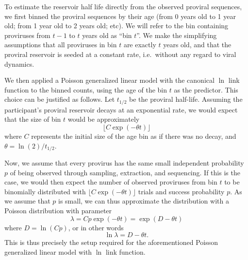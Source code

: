 \documentclass{article}
\begin{document}
To estimate the reservoir half life directly from the observed proviral
sequences, we first binned the proviral sequences by their age (from 0 years
old to 1 year old; from 1 year old to 2 years old; etc).  We will refer to the
bin containing proviruses from $t-1$ to $t$ years old as ``bin $t$''.  We make
the simplifying assumptions that all proviruses in bin $t$ are exactly $t$
years old, and that the proviral reservoir is seeded at a constant rate, i.e.\
without any regard to viral dynamics.

We then applied a Poisson generalized linear model with the canonical $\ln$
link function to the binned counts, using the age of the bin $t$ as the
predictor.  This choice can be justified as follows.  Let $t_{1/2}$ be the
proviral half-life.  Assuming the participant's proviral reservoir decays at an
exponential rate, we would expect that the size of bin $t$ would be
approximately
\[
\lfloor C \exp(-\theta t) \rfloor
\]
where $C$ represents the initial size of the age bin as if there was no decay,
and $\theta = \ln(2) / t_{1/2}$.

Now, we assume that every provirus has the same small independent probability
$p$ of being observed through sampling, extraction, and sequencing.  If this is
the case, we would then expect the number of observed proviruses from bin $t$
to be binomially distributed with $\lfloor C \exp(-\theta t) \rfloor$ trials
and success probability $p$.  As we assume that $p$ is small, we can thus
approximate the distribution with a Poisson distribution with parameter
\[
\lambda = Cp \exp(-\theta t) = \exp(D - \theta t)
\]
where $D = \ln(Cp)$, or in other words
\[
\ln \lambda = D - \theta t.
\]
This is thus precisely the setup required for the
aforementioned Poisson generalized linear model with $\ln$ link function.
\end{document}
